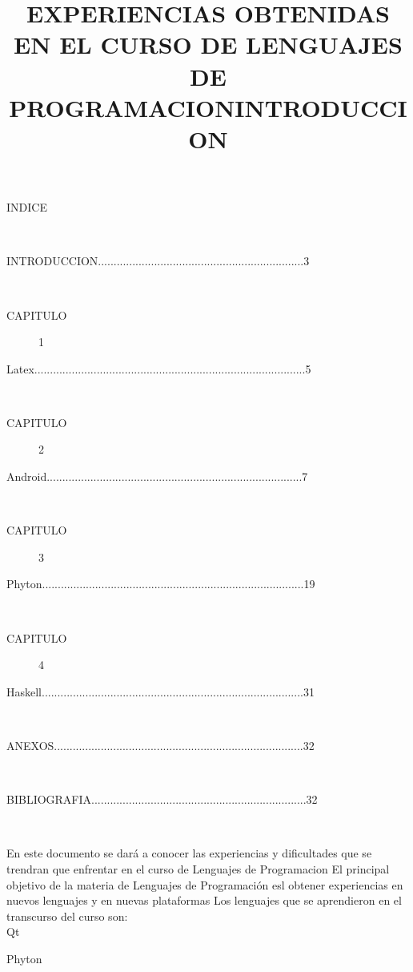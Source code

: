 \documentclass[12pt]{extbook}
\begin{document}
\title{EXPERIENCIAS OBTENIDAS EN EL CURSO DE LENGUAJES DE PROGRAMACION}\maketitle
\begin{center}
\begin{description}
\item [{INDICE}]~
\item [{INTRODUCCION..................................................................3}]~
\item [{CAPITULO}] 1
\item [{Latex.......................................................................................5}]~
\item [{CAPITULO}] 2
\item [{Android..................................................................................7}]~
\item [{CAPITULO}] 3
\item [{Phyton....................................................................................19}]~
\item [{CAPITULO}] 4
\item [{Haskell....................................................................................31}]~
\item [{ANEXOS................................................................................32}]~
\item [{BIBLIOGRAFIA.....................................................................32}]~
\end{description}


\newpage

\title{INTRODUCCION}\maketitle
\end{center}

En este documento se dará a conocer las experiencias y dificultades que se trendran que enfrentar en el curso de Lenguajes de Programacion
El principal objetivo de la materia de Lenguajes de Programación esl obtener experiencias en nuevos lenguajes y en nuevas plataformas
Los lenguajes que se aprendieron en el transcurso del curso son:\\

\textbullet{} Qt

\textbullet{} Phyton 
\end{document}
